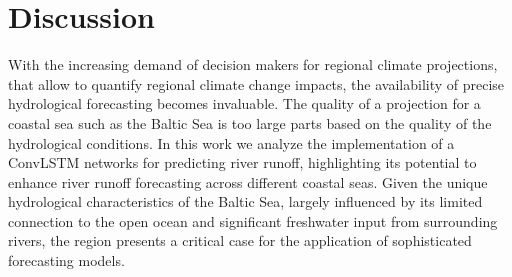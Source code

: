 \documentclass[
]{agujournal2019}
\begin{document}
\begin{figure}


\caption{\label{fig-evaluation_MOM}}

\end{figure}%

\section{Discussion}\label{sec-discussion}

With the increasing demand of decision makers for regional climate
projections, that allow to quantify regional climate change impacts, the
availability of precise hydrological forecasting becomes invaluable. The
quality of a projection for a coastal sea such as the Baltic Sea is too
large parts based on the quality of the hydrological conditions. In this
work we analyze the implementation of a ConvLSTM networks for predicting
river runoff, highlighting its potential to enhance river runoff
forecasting across different coastal seas. Given the unique hydrological
characteristics of the Baltic Sea, largely influenced by its limited
connection to the open ocean and significant freshwater input from
surrounding rivers, the region presents a critical case for the
application of sophisticated forecasting models.
\end{document}
